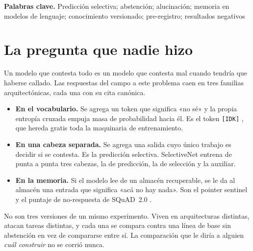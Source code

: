 \documentclass[11pt,a4paper]{article}
\begin{document}
\begin{abstract}
Decimos explícitamente qué \emph{no} habilitan estos resultados. Lo que se sostiene es que
\emph{separar la cabeza hace aprendible la abstención en este régimen}, no que \emph{el modelo sabe
cuándo no sabe}. El techo que queda es de calibración y no de capacidad ($\mathrm{AUC}$ $0{,}777$ a
$0{,}998$), y siete intentos pre-registrados de obtener la decisión sin etiquetas cayeron todos en
$\mathrm{AUC}$ $0{,}50$ a $0{,}67$.
\end{abstract}

\vspace{0.5em}
\noindent\textbf{Palabras clave.} Predicción selectiva; abstención; alucinación; memoria en modelos
de lenguaje; conocimiento versionado; pre-registro; resultados negativos

\section{La pregunta que nadie hizo}

Un modelo que contesta todo es un modelo que contesta mal cuando tendría que haberse callado. Las
respuestas del campo a este problema caen en tres familias arquitectónicas, cada una con su cita
canónica.

\begin{itemize}
\item \textbf{En el vocabulario.} Se agrega un token que significa «no sé» y la propia entropía
cruzada empuja masa de probabilidad hacia él. Es el token \texttt{[IDK]} \citep{cohen2024idk}, que
hereda gratis toda la maquinaria de entrenamiento.
\item \textbf{En una cabeza separada.} Se agrega una salida cuyo único trabajo es decidir si se
contesta. Es la predicción selectiva. SelectiveNet \citep{geifman2019selectivenet} entrena de punta
a punta tres cabezas, la de predicción, la de selección y la auxiliar.
\item \textbf{En la memoria.} Si el modelo lee de un almacén recuperable, se le da al almacén una
entrada que significa «acá no hay nada». Son el pointer sentinel \citep{merity2016pointer} y el
puntaje de no-respuesta de SQuAD~2.0 \citep{rajpurkar2018squad2}.
\end{itemize}

No son tres versiones de un mismo experimento. Viven en arquitecturas distintas, atacan tareas
distintas, y cada una se compara contra una línea de base sin abstención en vez de compararse entre
sí. La comparación que le diría a alguien \emph{cuál construir} no se corrió nunca.
\end{document}

